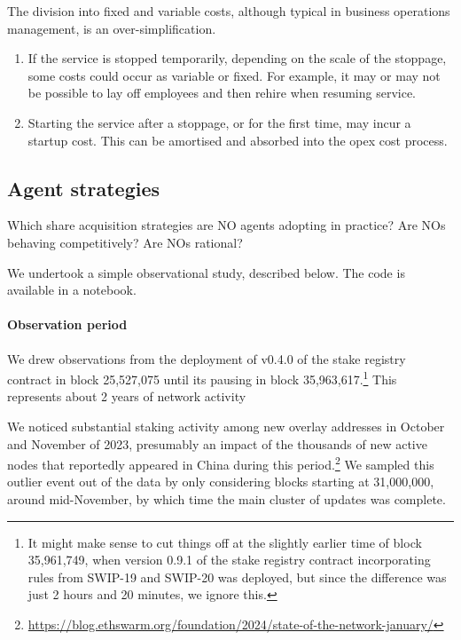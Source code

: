 The division into fixed and variable costs, although typical in business operations management, is an over-simplification.
%
\begin{enumerate}
  \item 
    If the service is stopped temporarily, depending on the scale of the stoppage, some costs could occur as variable or fixed.
    For example, it may or may not be possible to lay off employees and then rehire when resuming service.

  \item
    Starting the service after a stoppage, or for the first time, may incur a startup cost.
    This can be amortised and absorbed into the opex cost process.
\end{enumerate}





\subsection{Agent strategies}
\label{section:strategies}

Which share acquisition strategies are NO agents adopting in practice?
%
Are NOs behaving competitively?
%
Are NOs rational?

We undertook a simple observational study, described below.
%
The code is available in a notebook.

\paragraph{Observation period}
We drew observations from the deployment of v0.4.0 of the stake registry contract in block 25,527,075 until its pausing in block 35,963,617.\footnote{It might make sense to cut things off at the slightly earlier time of block 35,961,749, when version 0.9.1 of the stake registry contract incorporating rules from SWIP-19 and SWIP-20 was deployed, but since the difference was just 2 hours and 20 minutes, we ignore this.} This represents about 2 years of network activity

We noticed substantial staking activity among new overlay addresses in October and November of 2023, presumably an impact of the thousands of new active nodes that reportedly appeared in China during this period.\footnote{\url{https://blog.ethswarm.org/foundation/2024/state-of-the-network-january/}}
%
We sampled this outlier event out of the data by only considering blocks starting at 31,000,000, around mid-November, by which time the main cluster of updates was complete.

